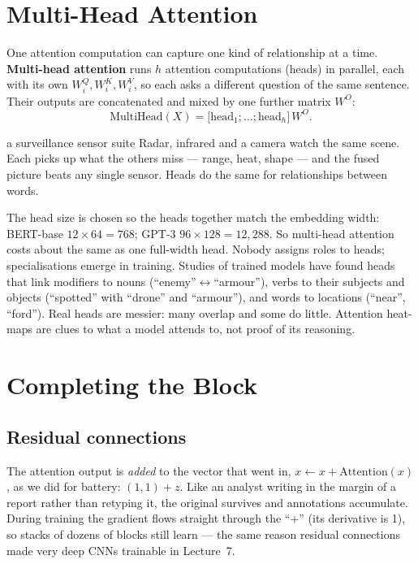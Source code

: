 \documentclass[11pt]{article}
\begin{document}
\section{Multi-Head Attention}
One attention computation can capture one kind of relationship at a time. \textbf{Multi-head attention} runs $h$ attention computations (heads) in parallel, each with its own $W^Q_i,W^K_i,W^V_i$, so each asks a different question of the same sentence. Their outputs are concatenated and mixed by one further matrix $W^O$:
\[\text{MultiHead}(X)=\big[\text{head}_1;\dots;\text{head}_h\big]\,W^O.\]
\begin{intuition}{a surveillance sensor suite}
Radar, infrared and a camera watch the same scene. Each picks up what the others miss --- range, heat, shape --- and the fused picture beats any single sensor. Heads do the same for relationships between words.
\end{intuition}
The head size is chosen so the heads together match the embedding width: BERT-base $12\times64=768$; GPT-3 $96\times128=12{,}288$. So multi-head attention costs about the same as one full-width head. Nobody assigns roles to heads; specialisations emerge in training. Studies of trained models have found heads that link modifiers to nouns (``enemy''$\leftrightarrow$``armour''), verbs to their subjects and objects (``spotted'' with ``drone'' and ``armour''), and words to locations (``near'', ``ford''). Real heads are messier: many overlap and some do little. Attention heat-maps are clues to what a model attends to, not proof of its reasoning.

\section{Completing the Block}
\subsection{Residual connections}
The attention output is \emph{added} to the vector that went in, $x\leftarrow x+\text{Attention}(x)$, as we did for battery: $(1,1)+z$. Like an analyst writing in the margin of a report rather than retyping it, the original survives and annotations accumulate. During training the gradient flows straight through the ``$+$'' (its derivative is 1), so stacks of dozens of blocks still learn --- the same reason residual connections made very deep CNNs trainable in Lecture~7.
\end{document}

